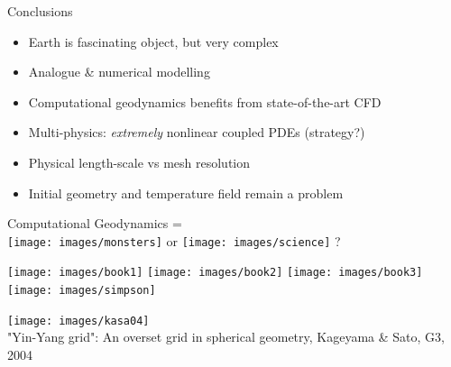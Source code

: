 \documentclass[handout]{beamer}
\begin{document}
\begin{frame}[plain]{Conclusions}

\begin{itemize}
\item Earth is fascinating object, but very complex
\item Analogue \& numerical modelling
\item Computational geodynamics benefits from state-of-the-art CFD 
\item Multi-physics: {\sl extremely} nonlinear coupled PDEs (strategy?)
\item Physical length-scale vs mesh resolution
\item Initial geometry and temperature field remain a problem
\end{itemize}

\pause

\begin{center}
Computational Geodynamics =\\ 
\texttt{[image: images/monsters]}\hspace{.5cm} {\huge or}
\hspace{.5cm} \texttt{[image: images/science]} ?
\end{center}

\end{frame}



\begin{frame}[plain]{}\end{frame}
\begin{frame}[plain]{}\end{frame}





\begin{frame}[plain]{}
\texttt{[image: images/book1]}
\texttt{[image: images/book2]}
\texttt{[image: images/book3]}
\texttt{[image: images/simpson]}
\end{frame}

\begin{frame}[plain]{}
\texttt{[image: images/kasa04]}\\
{\tiny "Yin-Yang grid": An overset grid in spherical geometry, Kageyama \& Sato, G3, 2004}
\end{frame}
\end{document}
